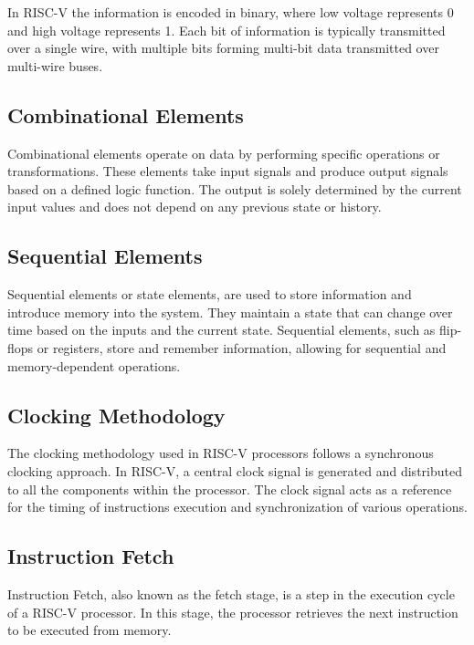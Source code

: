     In RISC-V the information is encoded in binary, where low voltage represents 0 and high voltage represents 1. Each bit of information is typically transmitted over a single wire, with multiple bits forming multi-bit data transmitted over multi-wire buses.

        \subsection{Combinational Elements} 
        
        Combinational elements operate on data by performing specific operations or transformations. These elements take input signals and produce output signals based on a defined logic function. The output is solely determined by the current input values and does not depend on any previous state or history.
        
        \subsection{Sequential Elements}
        
         Sequential elements or state elements, are used to store information and introduce memory into the system. They maintain a state that can change over time based on the inputs and the current state. Sequential elements, such as flip-flops or registers, store and remember information, allowing for sequential and memory-dependent operations.
        
        \subsection{Clocking Methodology}
        
        The clocking methodology used in RISC-V processors follows a synchronous clocking approach. In RISC-V, a central clock signal is generated and distributed to all the components within the processor. The clock signal acts as a reference for the timing of instructions execution and synchronization of various operations.
        
        \subsection{Instruction Fetch}
        
        Instruction Fetch, also known as the fetch stage, is a step in the execution cycle of a RISC-V processor. In this stage, the processor retrieves the next instruction to be executed from memory.
        
